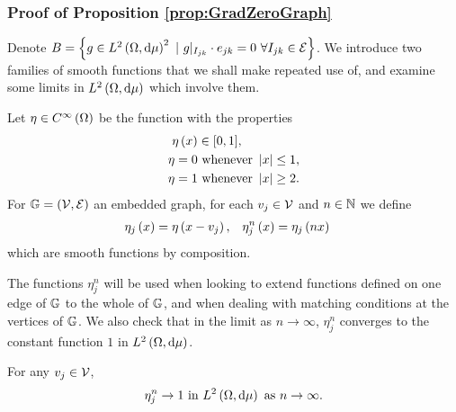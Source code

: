 \subsubsection{Proof of Proposition \ref{prop:GradZeroGraph}}
Denote $B = \left\{ g\in L^{2}\left( \Omega,\mathrm{d}\mu \right)^2 \ \vert \ g\vert_{I_{jk}}\cdot e_{jk}=0 \ \forall I_{jk}\in \mathcal{E} \right\}$.
We introduce two families of smooth functions that we shall make repeated use of, and examine some limits in $L^{2}\left( \Omega,\mathrm{d}\mu \right)$ which involve them.
\begin{definition} \label{def:etaDef}
	Let $\eta\in C^{\infty}\left( \Omega \right)$ be the function with the properties
	\begin{align*}
		\eta\left( x \right) &\in [0,1], \\
		\eta = 0 &\text{ whenever } \left\lvert x \right\rvert\leq 1, \\
		\eta = 1 &\text{ whenever } \left\lvert x \right\rvert\geq 2.
	\end{align*}
	For $\mathbb{G}=\left( \mathcal{V},\mathcal{E} \right)$ an embedded graph, for each $v_j\in \mathcal{V}$ and $n\in\mathbb{N}$ we define
	\begin{align}
		\eta_j\left( x \right) = \eta\left( x-v_j \right), &\quad \eta_j^n\left( x \right) = \eta_j\left( nx \right)
	\end{align}
	which are smooth functions by composition.
\end{definition}
The functions $\eta_j^n$ will be used when looking to extend functions defined on one edge of $\mathbb{G}$ to the whole of $\mathbb{G}$, and when dealing with matching conditions at the vertices of $\mathbb{G}$.
We also check that in the limit as $n\rightarrow\infty$, $\eta_j^n$ converges to the constant function $1$ in $L^{2}\left( \Omega,\mathrm{d}\mu \right)$.
\begin{lemma} \label{lem:etaConv}
	For any $v_j\in \mathcal{V}$, 
	\begin{align*}
		\eta_j^n \rightarrow 1 \text{ in } L^{2}\left( \Omega,\mathrm{d}\mu \right) \ \text{as} \ n \rightarrow\infty.
	\end{align*}
\end{lemma}

